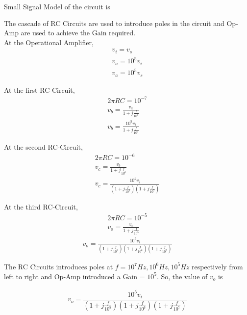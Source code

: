 \begin{enumerate}[label=\thesubsection.\arabic*.,ref=\thesubsection.\theenumi]
Small Signal Model of the circuit is
\begin{figure}[ht!]
	\begin{center}
		\resizebox{\columnwidth/1}{!}{}
	\end{center}
	\caption{}
	\label{fig:Circuit}
\end{figure}

The cascade of RC Circuits are used to introduce poles in the circuit and Op-Amp are used to achieve the Gain required.\\

At the Operational Amplifier,
\begin{align}
v_{i} = v_{s}\\
v_{a} = 10^5 v_{i}\\
v_{a} = 10^5 v_{s}
\end{align}

At the first RC-Circuit,
\begin{align}
2\pi RC = 10^{-7}\\
v_{b} = \frac{v_{a}}{1 + j\frac{f}{10^{7}}}\\
v_{b} = \frac{10^5 v_{i}}{1 + j\frac{f}{10^{7}}}
\end{align}

At the second RC-Circuit,
\begin{align}
2\pi RC = 10^{-6}\\
v_{c} = \frac{v_{b}}{1 + j\frac{f}{10^{6}}}\\
v_{c} = \frac{10^5 v_{i}}{(1 + j\frac{f}{10^{6}})(1 + j\frac{f}{10^{7}})}
\end{align}

At the third RC-Circuit,
\begin{align}
2\pi RC = 10^{-5}\\
v_{o} = \frac{v_{c}}{1 + j\frac{f}{10^{5}}}
\end{align}
\begin{align}
v_{o} = \frac{10^5 v_{i}}{(1 + j\frac{f}{10^{5}})(1 + j\frac{f}{10^{6}})(1 + j\frac{f}{10^{7}})}
\end{align}

The RC Circuits introduces poles at $f=10^{7} Hz, 10^{6} Hz, 10^{5} Hz$ respectively from left to right and Op-Amp introduced a Gain = $10^5$. So, the value of $v_{o}$ is

\begin{align}
v_{o} = \dfrac{10^5 v_{i}}{\left(1+j\frac{f}{10^{5}}\right)\left(1+j\frac{f}{10^{6}}\right)\left(1+j\frac{f}{10^{7}}\right)}
\end{align}


\end{enumerate}
